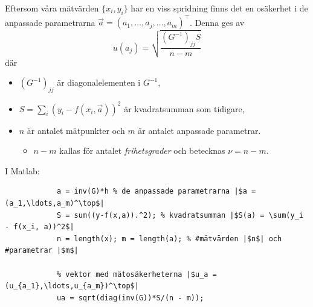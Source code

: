 \documentclass[9pt]{beamer}
\begin{document}
    \begin{frame}[fragile]
        Eftersom våra mätvärden $\{x_i, y_i\}$ har en viss spridning finns det
        en osäkerhet i de anpassade parametrarna $\vec a = (a_1,\ldots,a_j,\ldots,a_m)^\top$. Denna ges av
        \begin{equation*}
            u(a_j) = \sqrt{\frac{(G^{-1})_{jj}S}{n - m}}
        \end{equation*}
        där
        \begin{itemize}
            \item $(G^{-1})_{jj}$ är diagonalelementen i $G^{-1}$,
            \item $S=\sum_i(y_i - f(x_i,\vec a))^2$ är kvadratsumman som tidigare,
            \item $n$ är antalet mätpunkter och $m$ är antalet anpassade parametrar.
                \begin{itemize}
                    \item $n-m$ kallas för antalet \emph{frihetsgrader} och betecknas $\nu = n - m$.
                \end{itemize}
        \end{itemize}

        \vfill
        I Matlab:
        \begin{verbatim}
            a = inv(G)*h % de anpassade parametrarna |$a = (a_1,\ldots,a_m)^\top$|
            S = sum((y-f(x,a)).^2); % kvadratsumman |$S(a) = \sum(y_i - f(x_i, a))^2$|
            n = length(x); m = length(a); % #mätvärden |$n$| och #parametrar |$m$|

            % vektor med mätosäkerheterna |$u_a = (u_{a_1},\ldots,u_{a_m})^\top$|
            ua = sqrt(diag(inv(G))*S/(n - m));
        \end{verbatim}
    \end{frame}
\end{document}
